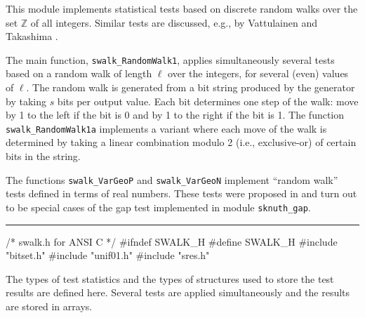 
This module implements statistical tests based on discrete random walks
 over the set $\mathbb{Z}$ of all integers.
Similar tests are discussed, e.g., by 
Vattulainen \cite{rVAT94a,rVAT95a} and Takashima \cite{rTAK96a}.

The main function, {\tt swalk\_RandomWalk1}, applies simultaneously
several tests based on a random walk of length $\ell$ over the 
integers, for several (even) values of $\ell$.
The random walk is generated from a bit string produced by the 
generator by taking $s$ bits per output value.
Each bit determines one step of the walk: move by 1 to the left
if the bit is 0 and by 1 to the right if the bit is 1.
The function {\tt swalk\_RandomWalk1a} implements a variant
where each move of the walk is determined by taking a linear
combination modulo 2 (i.e., exclusive-or) of certain bits in the string.

The functions {\tt swalk\_VarGeoP} and {\tt swalk\_VarGeoN} implement
``random walk'' tests defined in terms of real numbers.
These tests were proposed in \cite{rSHC97a} and turn out to be special
cases of the gap test implemented in module {\tt sknuth\_gap}.

\resdef

\bigskip\hrule

\code\hide
/* swalk.h  for ANSI C */
#ifndef SWALK_H
#define SWALK_H
\endhide
#include "bitset.h"
#include "unif01.h"
#include "sres.h"
\endcode


\ifdetailed   %



The types of test statistics and the types of structures 
used to store the test results are defined here.
Several tests are applied simultaneously and the results are stored
in arrays.


\code

